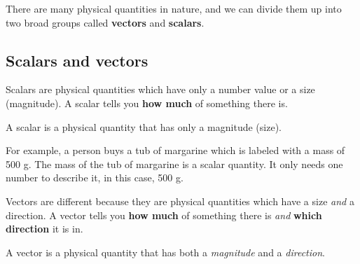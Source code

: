 There are many physical quantities in nature, and we can divide them up into two broad groups called \textbf{vectors} and \textbf{scalars}.


\subsection*{Scalars and vectors}
            \nopagebreak

Scalars are physical quantities which have only a number value or a size (magnitude). A scalar tells you \textbf{how much} of something there is. 

 {A scalar is a physical quantity that has only a magnitude (size).  } 

For example, a person buys a tub of margarine which is labeled with a mass of 500 g. The mass of the tub of margarine is a scalar quantity. It only needs one number to describe it, in this case, 500 g.  

Vectors are different because they are physical quantities which have a size \textit{and} a direction. A vector tells you \textbf{how much} of something there is \textit{and} \textbf{which direction} it is in.

 {A vector is a physical quantity that has both a \textit{magnitude} and a \textit{direction}.  }



 

